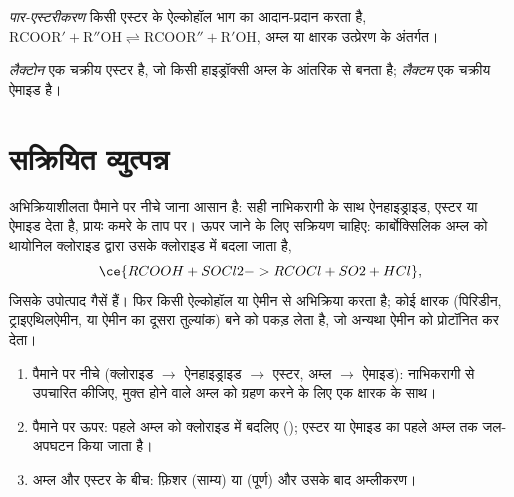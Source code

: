 \begin{definition}[पार-एस्टरीकरण]\label{def:b2:acyl-substitution:transesterification}
\emph{पार-एस्टरीकरण} किसी एस्टर के ऐल्कोहॉल भाग का आदान-प्रदान करता है,
$\mathrm{RCOOR' + R''OH \rightleftharpoons RCOOR'' + R'OH}$, अम्ल या क्षारक उत्प्रेरण के अंतर्गत।
\end{definition}

\begin{definition}[लैक्टोन और लैक्टम]\label{def:b2:acyl-substitution:lactone}
\emph{लैक्टोन} एक चक्रीय एस्टर है, जो किसी हाइड्रॉक्सी अम्ल के आंतरिक  से
बनता है; \emph{लैक्टम} एक चक्रीय ऐमाइड है।
\end{definition}

\section{सक्रियित व्युत्पन्न}

अभिक्रियाशीलता पैमाने पर नीचे जाना आसान है:  सही नाभिकरागी के साथ ऐनहाइड्राइड, एस्टर या
ऐमाइड देता है, प्रायः कमरे के ताप पर। ऊपर जाने के लिए सक्रियण चाहिए:
कार्बोक्सिलिक अम्ल को थायोनिल क्लोराइड द्वारा उसके क्लोराइड में बदला जाता है,
\[
  \ce{RCOOH + SOCl2 -> RCOCl + SO2 + HCl} ,
\]
जिसके उपोत्पाद गैसें हैं। फिर  किसी ऐल्कोहॉल या ऐमीन से अभिक्रिया करता है; कोई क्षारक
(पिरिडीन, ट्राइएथिलऐमीन, या ऐमीन का दूसरा तुल्यांक) बने  को पकड़ लेता है, जो
अन्यथा ऐमीन को प्रोटॉनित कर देता।

\begin{method}[व्युत्पन्नों के बीच चलना]\label{met:b2:acyl-substitution:ladder}
\begin{enumerate}
  \item पैमाने पर नीचे (क्लोराइड $\to$ ऐनहाइड्राइड $\to$ एस्टर, अम्ल $\to$ ऐमाइड): नाभिकरागी से
        उपचारित कीजिए, मुक्त होने वाले अम्ल को ग्रहण करने के लिए एक क्षारक के साथ।
  \item पैमाने पर ऊपर: पहले अम्ल को क्लोराइड में बदलिए (); एस्टर या ऐमाइड का
        पहले अम्ल तक जल-अपघटन किया जाता है।
  \item अम्ल और एस्टर के बीच: फ़िशर  (साम्य) या 
        (पूर्ण) और उसके बाद अम्लीकरण।
\end{enumerate}
\end{method}

